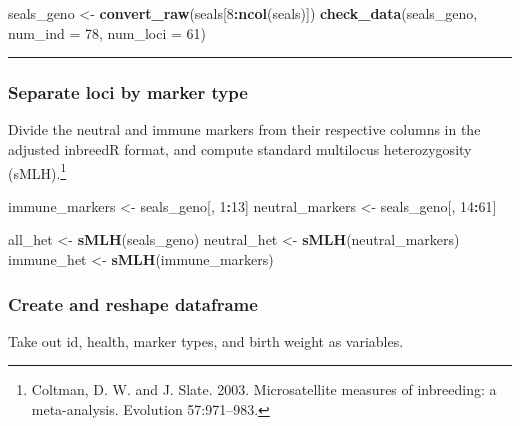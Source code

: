 \documentclass[]{article}
\newenvironment{Shaded}{\begin{snugshade}}{\end{snugshade}}
\newcommand{\KeywordTok}[1]{\textcolor[rgb]{0.13,0.29,0.53}{\textbf{#1}}}
\newcommand{\DataTypeTok}[1]{\textcolor[rgb]{0.13,0.29,0.53}{#1}}
\newcommand{\DecValTok}[1]{\textcolor[rgb]{0.00,0.00,0.81}{#1}}
\newcommand{\StringTok}[1]{\textcolor[rgb]{0.31,0.60,0.02}{#1}}
\newcommand{\OperatorTok}[1]{\textcolor[rgb]{0.81,0.36,0.00}{\textbf{#1}}}
\newcommand{\NormalTok}[1]{#1}
\let\rmarkdownfootnote\footnote%
\def\footnote{\protect\rmarkdownfootnote}
\begin{document}
\begin{Shaded}
\begin{Highlighting}[]
\NormalTok{seals_geno <-}\StringTok{ }\KeywordTok{convert_raw}\NormalTok{(seals[}\DecValTok{8}\OperatorTok{:}\KeywordTok{ncol}\NormalTok{(seals)])}
\KeywordTok{check_data}\NormalTok{(seals_geno, }\DataTypeTok{num_ind =} \DecValTok{78}\NormalTok{, }\DataTypeTok{num_loci =} \DecValTok{61}\NormalTok{)}
\end{Highlighting}
\end{Shaded}

\begin{center}\rule{0.5\linewidth}{\linethickness}\end{center}

\subsubsection{Separate loci by marker
type}\label{separate-loci-by-marker-type}

Divide the neutral and immune markers from their respective columns in
the adjusted inbreedR format, and compute standard multilocus
heterozygosity (sMLH).\footnote{Coltman, D. W. and J. Slate. 2003.
  Microsatellite measures of inbreeding: a meta-analysis. Evolution
  57:971--983.}

\begin{Shaded}
\begin{Highlighting}[]
\NormalTok{immune_markers <-}\StringTok{ }\NormalTok{seals_geno[, }\DecValTok{1}\OperatorTok{:}\DecValTok{13}\NormalTok{]}
\NormalTok{neutral_markers <-}\StringTok{ }\NormalTok{seals_geno[, }\DecValTok{14}\OperatorTok{:}\DecValTok{61}\NormalTok{]}

\NormalTok{all_het <-}\StringTok{ }\KeywordTok{sMLH}\NormalTok{(seals_geno)}
\NormalTok{neutral_het <-}\StringTok{ }\KeywordTok{sMLH}\NormalTok{(neutral_markers)}
\NormalTok{immune_het <-}\StringTok{ }\KeywordTok{sMLH}\NormalTok{(immune_markers)}
\end{Highlighting}
\end{Shaded}

\subsubsection{Create and reshape
dataframe}\label{create-and-reshape-dataframe}

Take out id, health, marker types, and birth weight as variables.
\end{document}

